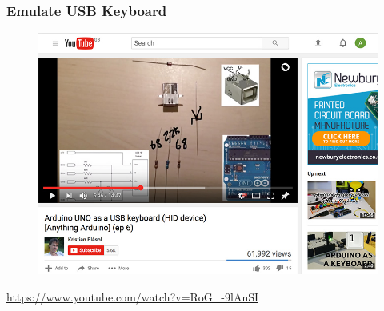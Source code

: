 \begin{frame}
	\frametitle{Emulate USB Keyboard}
	\begin{figure}
		\includegraphics[scale=.4]{assets/keyboard}  
	\end{figure}
	\url{https://www.youtube.com/watch?v=RoG_-9lAnSI}
\end{frame}





